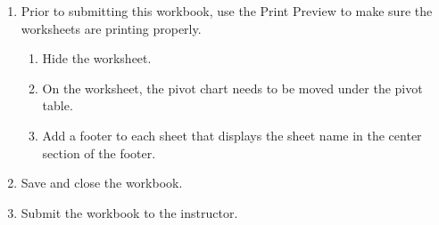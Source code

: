 \begin{enumerate}[resume]
	\item Prior to submitting this workbook, use the Print Preview to make sure the worksheets are printing properly.
	
	\begin{enumerate}
		\item Hide the  worksheet.
		\item On the  worksheet, the pivot chart needs to be moved under the pivot table.
		\item Add a footer to each sheet that displays the sheet name in the center section of the footer.
	\end{enumerate}
	
	\item Save and close the  workbook.
	\item Submit the  workbook to the instructor.
\end{enumerate}